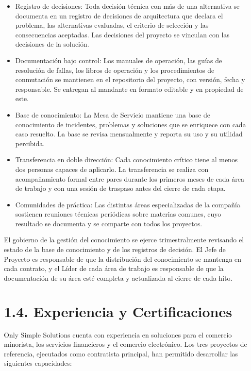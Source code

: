 \documentclass[11pt]{article}
\providecommand{\tightlist}{%
  \setlength{\itemsep}{0pt}\setlength{\parskip}{0pt}}
\begin{document}
\begin{itemize}
\tightlist
\item
  Registro de decisiones: Toda decisión técnica con más de una alternativa se documenta en un registro de decisiones de arquitectura que declara el problema, las alternativas evaluadas, el criterio de selección y las consecuencias aceptadas. Las decisiones del proyecto se vinculan con las decisiones de la solución.
\item
  Documentación bajo control: Los manuales de operación, las guías de resolución de fallas, los libros de operación y los procedimientos de conmutación se mantienen en el repositorio del proyecto, con versión, fecha y responsable. Se entregan al mandante en formato editable y en propiedad de este.
\item
  Base de conocimiento: La Mesa de Servicio mantiene una base de conocimiento de incidentes, problemas y soluciones que se enriquece con cada caso resuelto. La base se revisa mensualmente y reporta su uso y su utilidad percibida.
\item
  Transferencia en doble dirección: Cada conocimiento crítico tiene al menos dos personas capaces de aplicarlo. La transferencia se realiza con acompañamiento formal entre pares durante los primeros meses de cada área de trabajo y con una sesión de traspaso antes del cierre de cada etapa.
\item
  Comunidades de práctica: Las distintas áreas especializadas de la compañía sostienen reuniones técnicas periódicas sobre materias comunes, cuyo resultado se documenta y se comparte con todos los proyectos.
\end{itemize}

El gobierno de la gestión del conocimiento se ejerce trimestralmente revisando el estado de la base de conocimiento y de los registros de decisión. El Jefe de Proyecto es responsable de que la distribución del conocimiento se mantenga en cada contrato, y el Líder de cada área de trabajo es responsable de que la documentación de su área esté completa y actualizada al cierre de cada hito.

\section{1.4. Experiencia y Certificaciones}\label{experiencia-y-certificaciones}

Only Simple Solutions cuenta con experiencia en soluciones para el comercio minorista, los servicios financieros y el comercio electrónico. Los tres proyectos de referencia, ejecutados como contratista principal, han permitido desarrollar las siguientes capacidades:
\end{document}
